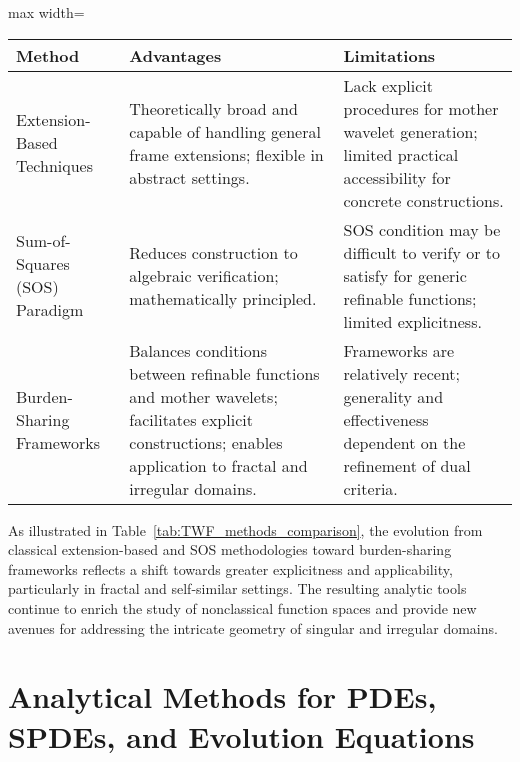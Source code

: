 \documentclass[sigconf]{acmart}
\begin{document}
\begin{table*}[htbp]
\centering
\caption{Comparison of Construction Methods for Tight Wavelet Frames (TWFs)}
\label{tab:TWF_methods_comparison}
\begin{adjustbox}{max width=\textwidth}
\begin{tabular}{lll}
\toprule
\textbf{Method} & \textbf{Advantages} & \textbf{Limitations} \\
\midrule
Extension-Based Techniques & Theoretically broad and capable of handling general frame extensions; flexible in abstract settings. & Lack explicit procedures for mother wavelet generation; limited practical accessibility for concrete constructions. \\
Sum-of-Squares (SOS) Paradigm & Reduces construction to algebraic verification; mathematically principled. & SOS condition may be difficult to verify or to satisfy for generic refinable functions; limited explicitness. \\
Burden-Sharing Frameworks & Balances conditions between refinable functions and mother wavelets; facilitates explicit constructions; enables application to fractal and irregular domains. & Frameworks are relatively recent; generality and effectiveness dependent on the refinement of dual criteria. \\
\bottomrule
\end{tabular}
\end{adjustbox}
\end{table*}

As illustrated in Table~\ref{tab:TWF_methods_comparison}, the evolution from classical extension-based and SOS methodologies toward burden-sharing frameworks reflects a shift towards greater explicitness and applicability, particularly in fractal and self-similar settings. The resulting analytic tools continue to enrich the study of nonclassical function spaces and provide new avenues for addressing the intricate geometry of singular and irregular domains.

\section{Analytical Methods for PDEs, SPDEs, and Evolution Equations}
\end{document}
